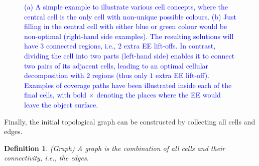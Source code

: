 \documentclass[journal]{IEEEtran}
\newtheorem{definition}[theorem]{Definition}
\begin{document}
\begin{figure}[t]
\centering
{}
\caption{\textcolor{blue}{(a) A simple example to illustrate various cell concepts, where the central cell is the only cell with non-unique possible colours.
(b) Just filling in the central cell with either blue or green colour would be non-optimal (right-hand side examples). 
The resulting solutions will have $3$ connected regions, i.e., $2$ extra EE lift-offs. 
In contrast, dividing the cell into two parts (left-hand side) enables it to connect two pairs of its adjacent cells, leading to an optimal cellular decomposition with $2$ regions (thus only $1$ extra EE lift-off). 
Examples of coverage paths have been illustrated inside each of the final cells, with bold $\bm \times$ denoting the places where the EE would leave the object surface.}
}\label{fig:concepts}
\end{figure}

Finally, the initial topological graph can be constructed by collecting all cells and edges. 
\begin{definition}
(Graph) A graph is the combination of all cells and their connectivity, i.e., the edges. 
\end{definition}
\end{document}
